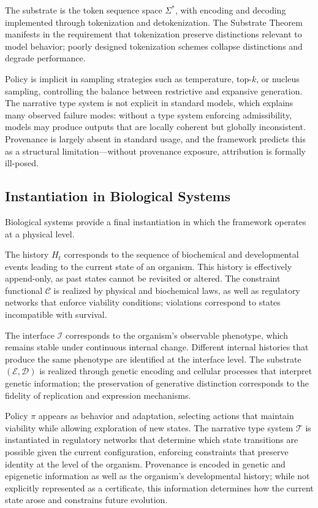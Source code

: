 \documentclass[12pt, a4paper]{article}
\theoremstyle{plain}
\theoremstyle{definition}
\theoremstyle{remark}
\begin{document}
The substrate is the token sequence space $\Sigma^*$, with encoding and decoding implemented through tokenization and detokenization. The Substrate Theorem manifests in the requirement that tokenization preserve distinctions relevant to model behavior; poorly designed tokenization schemes collapse distinctions and degrade performance.

Policy is implicit in sampling strategies such as temperature, top-$k$, or nucleus sampling, controlling the balance between restrictive and expansive generation. The narrative type system is not explicit in standard models, which explains many observed failure modes: without a type system enforcing admissibility, models may produce outputs that are locally coherent but globally inconsistent. Provenance is largely absent in standard usage, and the framework predicts this as a structural limitation---without provenance exposure, attribution is formally ill-posed.

\subsection{Instantiation in Biological Systems}

Biological systems provide a final instantiation in which the framework operates at a physical level.

The history $H_t$ corresponds to the sequence of biochemical and developmental events leading to the current state of an organism. This history is effectively append-only, as past states cannot be revisited or altered. The constraint functional $\mathcal{C}$ is realized by physical and biochemical laws, as well as regulatory networks that enforce viability conditions; violations correspond to states incompatible with survival.

The interface $\mathcal{I}$ corresponds to the organism's observable phenotype, which remains stable under continuous internal change. Different internal histories that produce the same phenotype are identified at the interface level. The substrate $(\mathcal{E}, \mathcal{D})$ is realized through genetic encoding and cellular processes that interpret genetic information; the preservation of generative distinction corresponds to the fidelity of replication and expression mechanisms.

Policy $\pi$ appears as behavior and adaptation, selecting actions that maintain viability while allowing exploration of new states. The narrative type system $\mathcal{T}$ is instantiated in regulatory networks that determine which state transitions are possible given the current configuration, enforcing constraints that preserve identity at the level of the organism. Provenance is encoded in genetic and epigenetic information as well as the organism's developmental history; while not explicitly represented as a certificate, this information determines how the current state arose and constrains future evolution.
\end{document}
